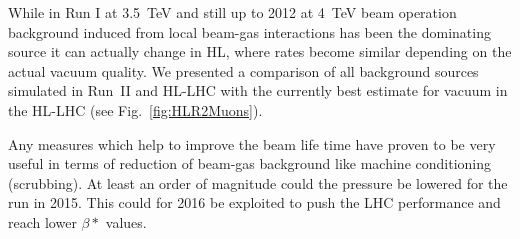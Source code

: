 While in Run I at 3.5~TeV and still up to 2012 at 4~TeV beam operation background induced from local beam-gas interactions has been the dominating source it can actually change in HL, where rates become similar depending on the actual vacuum quality. We presented a comparison of all background sources simulated in Run~II and HL-LHC with the currently best estimate for vacuum in the HL-LHC (see Fig.~\ref{fig:HLR2Muons}). 


Any measures which help to improve the beam life time have proven to be very useful in terms of reduction of beam-gas background like machine conditioning (scrubbing). At least an order of magnitude could the pressure be lowered for the run in 2015. This could for 2016 be exploited to push the LHC performance and reach lower $\beta*$ values. 
